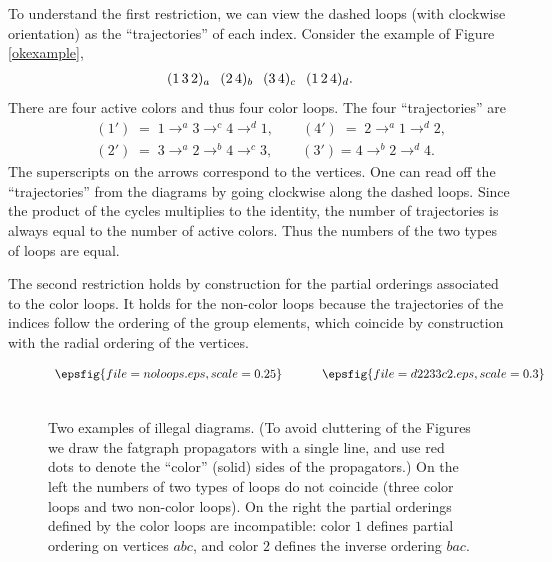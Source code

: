 \documentclass[letterpaper]{JHEP3}
\def\be{\begin{equation}}
\def\ee{\end{equation}}
\def\be{\begin{eqnarray}}
\def\ee{\end{eqnarray}}
\begin{document}
To understand the first restriction, we can view
 the dashed loops  (with clockwise orientation) as  the ``trajectories'' of each index. 
Consider the example  of Figure \ref{okexample},
\be
\begin{array}{c@{\hspace{0.1in}}c@{\hspace{0.1in}}c@{\hspace{0.1in}}c}
(1\, 3\, 2)_a&(2 \,4)_b&(3\, 4)_c&(1\, 2\, 4)_d.
\end{array}
\ee 
There are four active colors and thus four color loops.  The  four ``trajectories'' are
\be
&&(1')\;=\;1\to^a3\to^c4\to^d1,\qquad  (4')\;=\;2\to^a1\to^d 2,\\
&&(2')\;=\;3\to^a2\to^b4\to^c3,\qquad(3')=4\to^b 2\to^d 4.\nonumber
\ee 
The superscripts on the arrows correspond to the vertices. 
One can read off the ``trajectories'' from the diagrams by going clockwise along the dashed loops.
Since the product of the cycles multiplies to the identity, 
 the number of trajectories is always equal to the number of active colors.
Thus the numbers of the two types of loops are equal.


The second restriction holds by construction for the partial orderings associated to the color loops.
It  holds for the non-color loops because  the 
trajectories of the indices follow  the ordering of the group elements, which coincide by construction with the
radial ordering of the vertices.

\begin{figure}[htbp]
\begin{center}
$\begin{array}{c@{\hspace{0.45in}}c}
  \epsfig{file=noloops.eps,scale=0.25}& \epsfig{file=d2233c2.eps,scale=0.3}  \\
\\ [0.2cm]
\end{array}$
\end{center}
  \caption{Two examples of illegal diagrams. (To avoid cluttering of the Figures we draw the fatgraph propagators
  with a single line, and use red dots to denote the ``color'' (solid) sides of the propagators.)
   On the left the numbers of two types of loops do not coincide (three color loops
and two non-color loops).  On the
right the partial orderings
defined by the color loops are incompatible: color $1$ defines partial ordering on vertices $abc$, and color
$2$ defines the inverse ordering $bac$.} \label{orderexample}
\end{figure}
\end{document}
